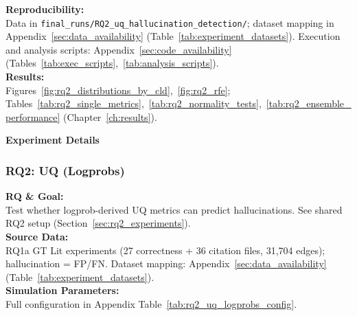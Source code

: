\textbf{Reproducibility:}\\
Data in \texttt{final\_runs/RQ2\_uq\_hallucination\_detection/}; dataset mapping in Appendix~\ref{sec:data_availability} (Table~\ref{tab:experiment_datasets}). Execution and analysis scripts: Appendix~\ref{sec:code_availability} (Tables~\ref{tab:exec_scripts},~\ref{tab:analysis_scripts}).\\
\textbf{Results:}\\
Figures~\ref{fig:rq2_distributions_by_cld},~\ref{fig:rq2_rfe}; Tables~\ref{tab:rq2_single_metrics},~\ref{tab:rq2_normality_tests},~\ref{tab:rq2_ensemble_performance} (Chapter~\ref{ch:results}).

\noindent\textbf{Experiment Details}

\subsubsection{RQ2: UQ (Logprobs)}
\label{sec:rq2_uq_logprobs}

\textbf{RQ \& Goal:}\\
Test whether logprob-derived UQ metrics can predict hallucinations. See shared RQ2 setup (Section~\ref{sec:rq2_experiments}).\\
\textbf{Source Data:}\\
RQ1a GT Lit experiments (27 correctness + 36 citation files, 31,704 edges); hallucination = FP/FN. Dataset mapping: Appendix~\ref{sec:data_availability} (Table~\ref{tab:experiment_datasets}).\\
\textbf{Simulation Parameters:}\\
Full configuration in Appendix Table~\ref{tab:rq2_uq_logprobs_config}.\\

